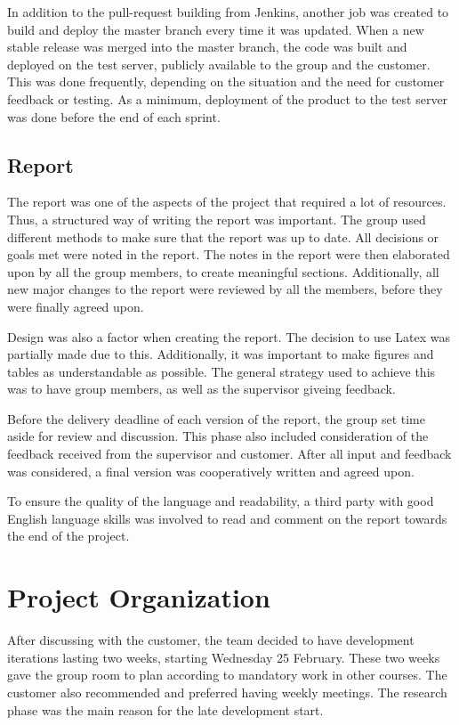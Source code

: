 In addition to the pull-request building from Jenkins, another job was created to build and deploy the master branch every time it was updated. When a new stable release was merged into the master branch, the code was built and deployed on the test server, publicly available to the group and the customer. This was done frequently, depending on the situation and the need for customer feedback or testing. As a minimum, deployment of the product to the test server was done before the end of each sprint.

\subsection{Report}
\label{subsec:process_and_methodology-process_methodology-report}

The report was one of the aspects of the project that required a lot of resources. Thus, a structured way of writing the report was important. The group used different methods to make sure that the report was up to date. All decisions or goals met were noted in the report. The notes in the report were then elaborated upon by all the group members, to create meaningful sections. Additionally, all new major changes to the report were reviewed by all the members, before they were finally agreed upon. 

Design was also a factor when creating the report. The decision to use Latex was partially made due to this. Additionally, it was important to make figures and tables as understandable as possible. The general strategy used to achieve this was to have group members, as well as the supervisor giveing feedback.

Before the delivery deadline of each version of the report, the group set time aside for review and discussion. This phase also included consideration of the feedback received from the supervisor and customer. After all input and feedback was considered, a final version was cooperatively written and agreed upon.

To ensure the quality of the language and readability, a third party with good English language skills was involved to read and comment on the report towards the end of the project.

\section{Project Organization}
\label{sec:process_and_methodology-project_organization}

After discussing with the customer, the team decided to have development iterations lasting two weeks, starting Wednesday 25 February. These two weeks gave the group room to plan according to mandatory work in other courses. The customer also recommended and preferred having weekly meetings. The research phase was the main reason for the late development start.


